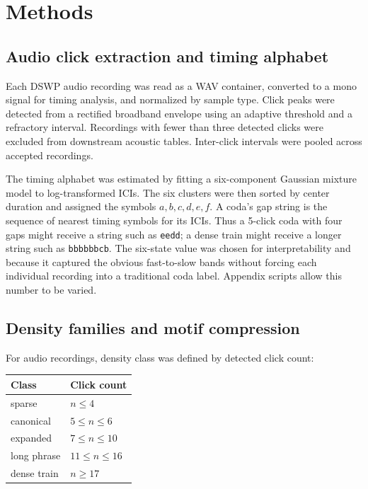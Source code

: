 \documentclass[11pt]{article}
\begin{document}
\section{Methods}

\subsection{Audio click extraction and timing alphabet}

Each DSWP audio recording was read as a WAV container, converted to a mono signal for timing analysis, and normalized by sample type. Click peaks were detected from a rectified broadband envelope using an adaptive threshold and a refractory interval. Recordings with fewer than three detected clicks were excluded from downstream acoustic tables. Inter-click intervals were pooled across accepted recordings.

The timing alphabet was estimated by fitting a six-component Gaussian mixture model to log-transformed ICIs. The six clusters were then sorted by center duration and assigned the symbols $a,b,c,d,e,f$. A coda's gap string is the sequence of nearest timing symbols for its ICIs. Thus a 5-click coda with four gaps might receive a string such as \texttt{eedd}; a dense train might receive a longer string such as \texttt{bbbbbbcb}. The six-state value was chosen for interpretability and because it captured the obvious fast-to-slow bands without forcing each individual recording into a traditional coda label. Appendix scripts allow this number to be varied.

\subsection{Density families and motif compression}

For audio recordings, density class was defined by detected click count:
\begin{center}
\begin{tabular}{ll}
\toprule
Class & Click count \\
\midrule
sparse & $n \leq 4$ \\
canonical & $5 \leq n \leq 6$ \\
expanded & $7 \leq n \leq 10$ \\
long phrase & $11 \leq n \leq 16$ \\
dense train & $n \geq 17$ \\
\bottomrule
\end{tabular}
\end{center}
\end{document}
